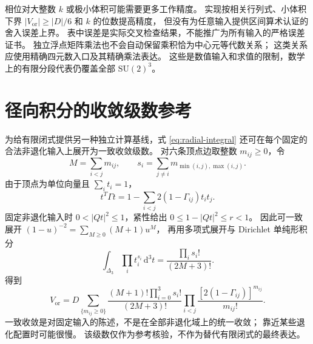 \documentclass[UTF8,11pt,fontset=none]{ctexart}
\numberwithin{equation}{section}
\theoremstyle{definition}
\newcommand{\dd}{\mathrm d}
\newcommand{\SU}{\mathrm{SU}(2)}
\newcommand{\Vor}{V_{\mathrm{or}}}
\begin{document}
相位对大整数 $k$ 或极小体积可能需要更多工作精度。
实现按相关行列式、小体积下界 $|\Vor|\ge|D|/6$ 和 $k$ 的位数提高精度，
但没有为任意输入提供区间算术认证的舍入误差上界。
表中误差是实际交叉检查结果，不能推广为所有输入的严格误差证书。
独立浮点矩阵乘法也不会自动保留乘积恰为中心元等代数关系；
这类关系应使用精确四元数入口及其精确乘法表达。
这些是数值输入和求值的限制，数学上的有限分段代表仍覆盖全部 $\SU^3$。

\appendix
\section{径向积分的收敛级数参考}\label{app:series}

为给有限闭式提供另一种独立计算基线，式 \eqref{eq:radial-integral}
还可在每个固定的合法非退化输入上展开为一致收敛级数。
对六条顶点边取整数 $m_{ij}\ge0$，令
\[
 M=\sum_{i<j}m_{ij},\qquad
 s_i=\sum_{j\ne i}m_{\min(i,j),\max(i,j)}.
\]
由于顶点为单位向量且 $\sum_i t_i=1$，
\[
 t^T\Gamma t
 =1-\sum_{i<j}2(1-\Gamma_{ij})t_it_j.
\]
固定非退化输入时 $0<|Qt|^2\le1$，紧性给出
$0\le1-|Qt|^2\le r<1$。
因此可一致展开 $(1-u)^{-2}=\sum_{M\ge0}(M+1)u^M$，
再用多项式展开与 Dirichlet 单纯形积分
\[
 \int_{\Delta_3}\prod_i t_i^{s_i}\,\dd^3t
 =\frac{\prod_i s_i!}{(2M+3)!}.
\]
得到
\begin{equation}
 \Vor=
 D\sum_{\{m_{ij}\ge0\}}
 \frac{(M+1)!\prod_{i=0}^3s_i!}{(2M+3)!}
 \prod_{i<j}
 \frac{[2(1-\Gamma_{ij})]^{m_{ij}}}{m_{ij}!}.
 \label{eq:series}
\end{equation}
一致收敛是对固定输入的陈述，不是在全部非退化域上的统一收敛；
靠近某些退化配置时可能很慢。
该级数仅作为参考核验，不作为替代有限闭式的最终表达。
\end{document}
